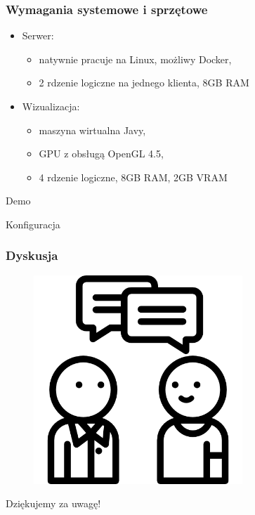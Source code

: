 \documentclass[aspectratio=169]{beamer}
\begin{document}
\begin{frame}
	\frametitle{Wymagania systemowe i sprzętowe}
	\begin{itemize}
	\item<2-> Serwer:
		\begin{itemize}
		\item<3-> natywnie pracuje na Linux, możliwy Docker,
		\item<4-> 2 rdzenie logiczne na jednego klienta, 8GB RAM 
		\end{itemize}
	\item<5-> Wizualizacja:
		\begin{itemize}
		\item<6-> maszyna wirtualna Javy,
		\item<7-> GPU z obsługą OpenGL 4.5,
		\item<8-> 4 rdzenie logiczne, 8GB RAM, 2GB VRAM 
		\end{itemize}	
	\end{itemize}
\end{frame}

\begin{frame}
	  \begin{center}
	\Huge Demo
	\end{center}
\end{frame}

\begin{frame}
	  \begin{center}
	\Huge Konfiguracja
	\end{center}
\end{frame}

\begin{frame}
	\frametitle{Dyskusja}
	\begin{figure}
		\centering
		\includegraphics[width=0.7\textwidth]{questions.png}
	\end{figure}
\end{frame}


\begin{frame}
	  \begin{center}
	\Huge Dziękujemy za uwagę!
	\end{center}
\end{frame}
\end{document}
